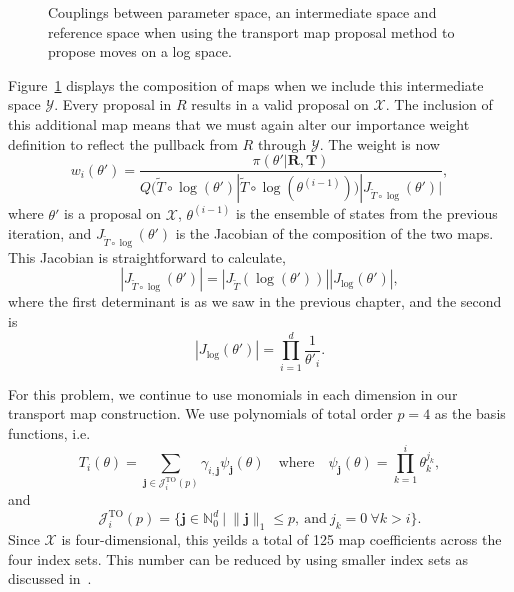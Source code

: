 \documentclass[final]{siamltex}
\newcommand\irregularcircle[2]{%
  \pgfextra {\pgfmathsetmacro\len{(#1)+rand*(#2)}}
  +(0:\len pt)
  \foreach \a in {10,20,...,350}{
    \pgfextra {\pgfmathsetmacro\len{(#1)+rand*(#2)}}
    -- +(\a:\len pt)
  } -- cycle
}
\begin{document}
\begin{figure}
	\centering
	\caption{Couplings between parameter space, an intermediate space and reference space when using the transport map proposal method to propose moves on a log space.}
	\label{fig:chem_log_coupling}
\end{figure}

Figure~\ref{fig:chem_log_coupling} displays the composition of maps when we include this intermediate space $\mathcal{Y}$. Every proposal in $R$ results in a valid proposal on $\mathcal{X}$. The inclusion of this additional map means that we must again alter our importance weight definition to reflect the pullback from $R$ through $\mathcal{Y}$. The weight is now
\[
	w_i(\theta') = \frac{\pi(\theta'|\mathbf{R},\mathbf{T})}{Q(\tilde{T}\circ\log(\theta')|\tilde{T}\circ\log(\theta^{(i-1)}))|J_{\tilde{T}\circ\log}(\theta')|},
\]
where $\theta'$ is a proposal on $\mathcal{X}$, $\theta^{(i-1)}$ is the ensemble of states from the previous iteration, and $J_{\tilde{T}\circ\log}(\theta')$ is the Jacobian of the composition of the two maps. This Jacobian is straightforward to calculate,
\[
	|J_{\tilde{T}\circ\log}(\theta')| = |J_{\tilde{T}}(\log(\theta'))||J_{\log}(\theta')|,
\]
where the first determinant is as we saw in the previous chapter, and the second is
\[
	|J_{\log}(\theta')| = \prod\limits_{i=1}^d \frac{1}{\theta'_i}.
\]

For this problem, we continue to use monomials in each dimension in our transport map construction. We use polynomials of total order $p=4$ as the basis functions, i.e.
\[
	T_i(\theta) = \sum_{\mathbf{j}\in\mathcal{J}^{\text{TO}}_i(p)} \gamma_{i,\mathbf{j}}\psi_{\mathbf{j}}(\theta) \quad \text{where} \quad \psi_\mathbf{j}(\theta) = \prod\limits_{k=1}^i \theta_k^{j_k},
\]
and
\[
	\mathcal{J}^{\text{TO}}_i(p) = \{\mathbf{j} \in \mathbb{N}^d_0\ |\ \|\mathbf{j}\|_1 \leq p, \ \text{and}\ j_k = 0\ \forall k > i\}.
\]
Since $\mathcal{X}$ is four-dimensional, this yeilds a total of 125 map coefficients across the four index sets. This number can be reduced by using smaller index sets as discussed in~\cite{parno2014transport}.
\end{document}
